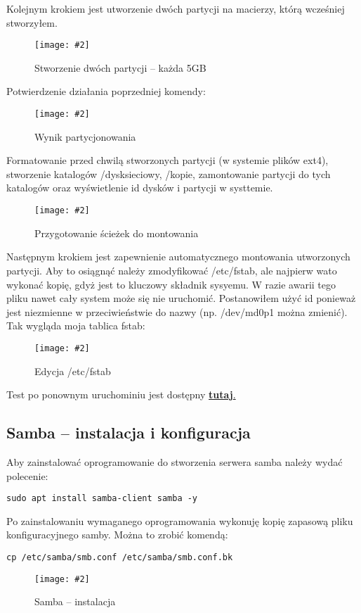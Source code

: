 \documentclass[a4paper]{article}
\newcommand*{\zdj}[2][\textwidth]{\texttt{[image: \#2]}}
\newcommand*{\fg}[4][!htb]{
      \begin{figure*}[#1]
            \zdj{#2}
            \caption[#4]{#3}
      \end{figure*}
}
\begin{document}
\newpage
Kolejnym krokiem jest utworzenie dwóch partycji na macierzy, którą wcześniej stworzyłem.
\fg{contents/configuration/Raid5/5.png}{Stworzenie dwóch partycji – każda 5GB}{Stworzenie dwóch partycji}

Potwierdzenie działania poprzedniej komendy: 
\fg{contents/configuration/Raid5/6.png}{Wynik partycjonowania}{Wynik partycjonowania}

\newpage
Formatowanie przed chwilą stworzonych partycji (w systemie plików ext4), stworzenie katalogów /dysksieciowy, /kopie, zamontowanie partycji do tych katalogów oraz wyświetlenie id dysków i partycji w systtemie.
\fg{contents/configuration/Raid5/7.png}{Przygotowanie ścieżek do montowania}{Przygotowanie ścieżek do montowania}

Następnym krokiem jest zapewnienie automatycznego montowania utworzonych partycji. Aby to osiągnąć należy zmodyfikować /etc/fstab, ale najpierw wato wykonać kopię, gdyż jest to kluczowy składnik sysyemu. W razie awarii tego pliku nawet cały system może się nie uruchomić. Postanowiłem użyć id ponieważ jest niezmienne w przeciwieństwie do nazwy (np. /dev/md0p1 można zmienić). Tak wygląda moja tablica fstab:
\fg{contents/configuration/Raid5/9.png}{Edycja /etc/fstab}{Edycja /etc/fstab}
\vspace*{-5pt}
Test po ponownym uruchominiu jest dostępny \hyperref[fig:raid5-auto-mount-test]{\textbf{tutaj}.}

\vspace*{-5pt}
\subsection{Samba – instalacja i konfiguracja}
\vspace*{-5pt}
Aby zainstalować oprogramowanie do stworzenia serwera samba należy wydać polecenie:
\vspace*{-5pt}
\begin{Verbatim}[frame=single]
      sudo apt install samba-client samba -y
\end{Verbatim}
\vspace*{-5pt}

Po zainstalowaniu wymaganego oprogramowania wykonuję kopię zapasową pliku konfiguracyjnego samby. Można to zrobić komendą:
\vspace*{-5pt}
\begin{Verbatim}[frame=single]
cp /etc/samba/smb.conf /etc/samba/smb.conf.bk
\end{Verbatim}
\fg{contents/configuration/Samba/2.png}{Samba – instalacja}{Samba – instalacja}
\newpage
\end{document}

